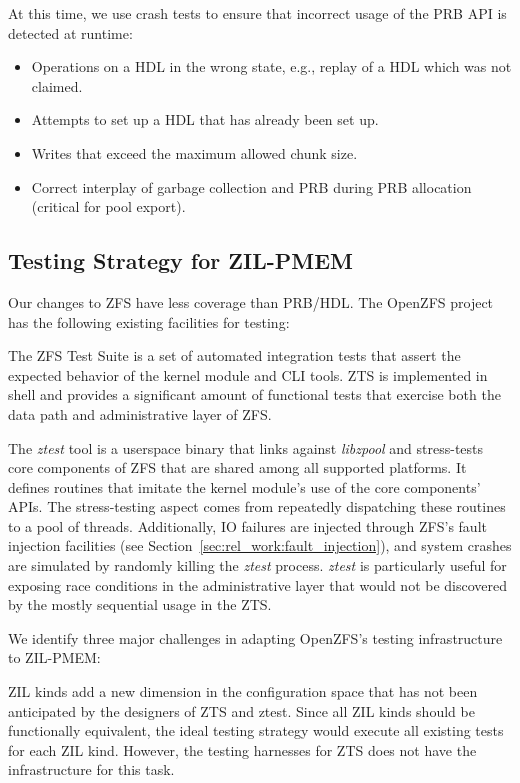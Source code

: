\documentclass[12pt,a4paper,twoside]{book}
\begin{document}
{At this time, we use crash tests to ensure that incorrect usage of the PRB API is detected at runtime:
\begin{itemize}[noitemsep]
    \item Operations on a HDL in the wrong state, e.g., replay of a HDL which was not claimed.
    \item Attempts to set up a HDL that has already been set up.
    \item Writes that exceed the maximum allowed chunk size.
    \item Correct interplay of garbage collection and PRB during PRB allocation (critical for pool export).
\end{itemize}

\subsection{Testing Strategy for ZIL-PMEM}\label{sec:eval:correctness:zilpmem}

Our changes to ZFS have less coverage than PRB/HDL.
The OpenZFS project has the following existing facilities for testing:
\begin{description}[noitemsep]
    \item[ZFS Test Suite (ZTS)] The ZFS Test Suite is a set of automated integration tests that assert the expected behavior of the kernel module and CLI tools.
        ZTS is implemented in shell and provides a significant amount of functional tests that exercise both the data path and administrative layer of ZFS.
    \item[ztest] The \textit{ztest} tool is a userspace binary that links against \textit{libzpool} and stress-tests core components of ZFS that are shared among all supported platforms.
        It defines routines that imitate the kernel module's use of the core components' APIs.
        The stress-testing aspect comes from repeatedly dispatching these routines to a pool of threads.
        Additionally, IO failures are injected through ZFS's fault injection facilities (see Section~\ref{sec:rel_work:fault_injection}), and system crashes are simulated by randomly killing the \textit{ztest} process.
        \textit{ztest} is particularly useful for exposing race conditions in the administrative layer that would not be discovered by the mostly sequential usage in the ZTS.
\end{description}

We identify three major challenges in adapting OpenZFS's testing infrastructure to ZIL-PMEM:
\begin{description}[noitemsep]
    \item[Dimensionality] ZIL kinds add a new dimension in the configuration space that has not been anticipated by the designers of ZTS and ztest.
        Since all ZIL kinds should be functionally equivalent, the ideal testing strategy would execute all existing tests for each ZIL kind.
        However, the testing harnesses for ZTS does not have the infrastructure for this task.


\end{description}}
\end{document}
